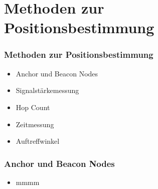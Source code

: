 \section{Methoden zur Positionsbestimmung}
\label{sec:methoden}

\begin{frame}

\frametitle{Methoden zur Positionsbestimmung}

\begin{itemize}
   \item Anchor und Beacon Nodes
   \item Signalstärkemessung
   \item Hop Count
   \item Zeitmessung
   \item Auftreffwinkel
\end{itemize}

\end{frame}

\begin{frame}
\frametitle{Anchor und Beacon Nodes}

\begin{itemize}
  \item mmmm
\end{itemize}
\end{frame}
